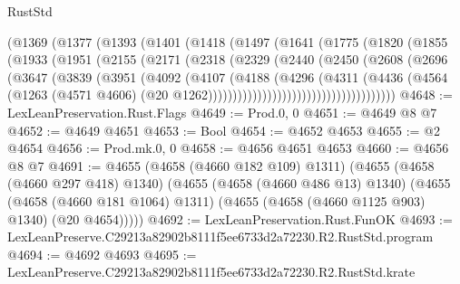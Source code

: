 \begin{lexlean}{RustStd}
\begin{coremodule}
                (@1369
                  (@1377
                    (@1393
                      (@1401
                        (@1418
                          (@1497
                            (@1641
                              (@1775
                                (@1820
                                  (@1855
                                    (@1933
                                      (@1951
                                        (@2155
                                          (@2171
                                            (@2318
                                              (@2329
                                                (@2440
                                                  (@2450
                                                    (@2608
                                                      (@2696
                                                        (@3647
                                                          (@3839
                                                            (@3951
                                                              (@4092
                                                                (@4107
                                                                  (@4188
                                                                    (@4296
                                                                      (@4311
                                                                        (@4436
                                                                          (@4564
                                                                            (@1263
                                                                              (@4571 @4606)
                                                                              (@20
                                                                                @1262))))))))))))))))))))))))))))))))))))))
@4648 := LexLeanPreservation.Rust.Flags
@4649 := Prod.{0, 0}
@4651 := @4649 @8 @7
@4652 := @4649 @4651
@4653 := Bool
@4654 := @4652 @4653
@4655 := @2 @4654
@4656 := Prod.mk.{0, 0}
@4658 := @4656 @4651 @4653
@4660 := @4656 @8 @7
@4691 := @4655
    (@4658 (@4660 @182 @109) @1311)
    (@4655
      (@4658 (@4660 @297 @418) @1340)
      (@4655
        (@4658 (@4660 @486 @13) @1340)
        (@4655
          (@4658 (@4660 @181 @1064) @1311)
          (@4655 (@4658 (@4660 @1125 @903) @1340) (@20 @4654)))))
@4692 := LexLeanPreservation.Rust.FunOK
@4693 := LexLeanPreserve.C29213a82902b8111f5ee6733d2a72230.R2.RustStd.program
@4694 := @4692 @4693
@4695 := LexLeanPreserve.C29213a82902b8111f5ee6733d2a72230.R2.RustStd.krate

\end{coremodule}
\end{lexlean}
